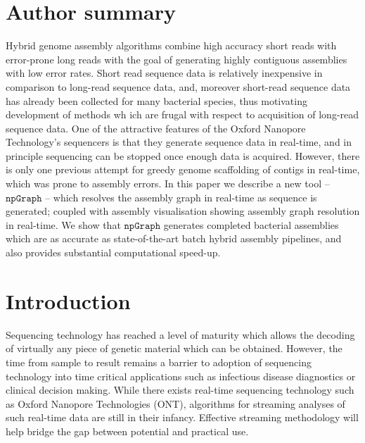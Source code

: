 \documentclass[10pt,letterpaper]{article}
\newcommand{\npgraph}{$\mathtt{npGraph}$}
\begin{document}
\section*{Author summary}
Hybrid genome assembly algorithms combine high accuracy short reads with error-prone long reads with the goal of generating highly contiguous assemblies with low error rates.  
Short read sequence data is relatively inexpensive in comparison to long-read sequence data, and, moreover short-read sequence data has already been collected for many bacterial species, thus motivating development of methods wh
ich are frugal with respect to acquisition of long-read sequence data.   One of the attractive features of the Oxford Nanopore Technology’s sequencers is that they generate sequence data in real-time, and in principle sequencing can be stopped once enough data is acquired.   However, there is only one previous attempt for greedy genome scaffolding of contigs in real-time, which was prone to assembly errors.   
In this paper we describe a new tool – \npgraph{} – which resolves the assembly graph in real-time as sequence is generated; coupled with assembly visualisation showing assembly graph resolution in real-time.  We show that \npgraph{} generates completed bacterial assemblies which are as accurate as state-of-the-art batch hybrid assembly pipelines, and also provides substantial computational speed-up. 

\linenumbers

\section*{Introduction}

Sequencing technology has reached a level of maturity which allows the decoding of virtually any piece of genetic material which  can be obtained. 
However, the time from sample to result remains a barrier to adoption of sequencing technology into time critical applications such as infectious disease diagnostics or clinical decision making. 
While there exists real-time sequencing technology such as Oxford Nanopore Technologies (ONT), algorithms for streaming analyses of such real-time data are still in their infancy. Effective streaming methodology will help bridge the gap between potential and practical use. 
\end{document}

